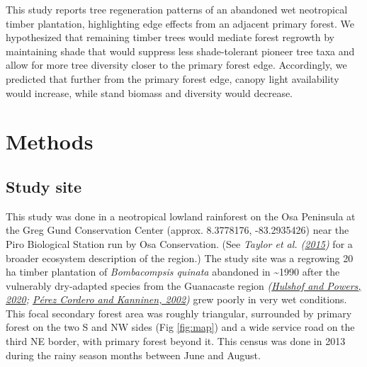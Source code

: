 \documentclass[
  12pt,
]{article}
\begin{document}
This study reports tree regeneration patterns of an abandoned wet neotropical timber plantation, highlighting edge effects from an adjacent primary forest.
We hypothesized that remaining timber trees would mediate forest regrowth by maintaining shade that would suppress less shade-tolerant pioneer tree taxa and allow for more tree diversity closer to the primary forest edge.
Accordingly, we predicted that further from the primary forest edge, canopy light availability would increase, while stand biomass and diversity would decrease.

\hypertarget{methods}{%
\section{Methods}\label{methods}}

\hypertarget{study-site}{%
\subsection{Study site}\label{study-site}}

This study was done in a neotropical lowland rainforest on the Osa Peninsula at the Greg Gund Conservation Center (approx. 8.3778176, -83.2935426) near the Piro Biological Station run by Osa Conservation.
(See \emph{Taylor et al. (\protect\hyperlink{ref-taylor15}{2015})} for a broader ecosystem description of the region.)
The study site was a regrowing 20 ha timber plantation of \emph{Bombacompsis quinata} abandoned in \textasciitilde1990 after the vulnerably dry-adapted species from the Guanacaste region \emph{(\protect\hyperlink{ref-hulshof20}{Hulshof and Powers, 2020}; \protect\hyperlink{ref-perezcordero02}{Pérez Cordero and Kanninen, 2002})} grew poorly in very wet conditions.
This focal secondary forest area was roughly triangular, surrounded by primary forest on the two S and NW sides (Fig \ref{fig:map}) and a wide service road on the third NE border, with primary forest beyond it.
This census was done in 2013 during the rainy season months between June and August.
\end{document}
